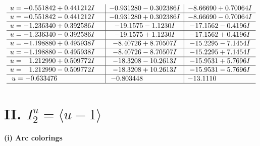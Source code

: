 \documentclass[1p]{elsarticle_modified}
\theoremstyle{definition}
\begin{document}
$$\begin{array}{c|c|c}
\begin{aligned}
u &= -0.551842 + 0.441212 I\end{aligned}
 & -0.931280 - 0.302386 I & -8.66690 + 0.70064 I \\ \hline\begin{aligned}
u &= -0.551842 - 0.441212 I\end{aligned}
 & -0.931280 + 0.302386 I & -8.66690 - 0.70064 I \\ \hline\begin{aligned}
u &= -1.236340 + 0.392586 I\end{aligned}
 & -19.1575 - 1.1230 I & -17.1562 - 0.4196 I \\ \hline\begin{aligned}
u &= -1.236340 - 0.392586 I\end{aligned}
 & -19.1575 + 1.1230 I & -17.1562 + 0.4196 I \\ \hline\begin{aligned}
u &= -1.198880 + 0.495938 I\end{aligned}
 & -8.40726 + 8.70507 I & -15.2295 - 7.1454 I \\ \hline\begin{aligned}
u &= -1.198880 - 0.495938 I\end{aligned}
 & -8.40726 - 8.70507 I & -15.2295 + 7.1454 I \\ \hline\begin{aligned}
u &= \phantom{-}1.212990 + 0.509772 I\end{aligned}
 & -18.3208 - 10.2613 I & -15.9531 + 5.7696 I \\ \hline\begin{aligned}
u &= \phantom{-}1.212990 - 0.509772 I\end{aligned}
 & -18.3208 + 10.2613 I & -15.9531 - 5.7696 I \\ \hline\begin{aligned}
u &= -0.633476\phantom{ +0.000000I}\end{aligned}
 & -0.803448\phantom{ +0.000000I} & -13.1110\phantom{ +0.000000I}\\
 \hline 
 \end{array}$$\newpage\newpage\renewcommand{\arraystretch}{1}
\centering \section*{II. $I^u_{2}= \langle u-1 \rangle$}
\flushleft \textbf{(i) Arc colorings}\\
\end{document}
